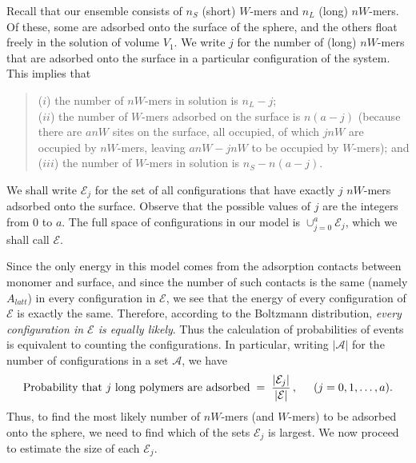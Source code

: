 \documentclass[journal=jacsat,manuscript=article]{achemso}
\begin{document}
Recall that our ensemble consists of $n_S$ (short) $W$-mers and $n_L$ (long) $nW$-mers.
Of these, some are adsorbed onto the surface of the sphere, and the others float freely in the 
solution of volume $V_1$.  We write $j$ for the number of (long) $nW$-mers that are adsorbed 
onto the surface in a particular configuration of the system.  This implies that
\begin{verse}
 ($i$) the number of $nW$-mers in solution is $n_L-j$;
 \\
 ($ii$) the number of $W$-mers adsorbed on the surface is $n(a-j)$ (because there are $anW$ sites on the
 surface, all occupied, of which $jnW$ are occupied by $nW$-mers, leaving $anW-jnW$ to be 
 occupied by $W$-mers); and
 \\
 ($iii$) the number of $W$-mers in solution is $n_S-n(a-j)$.
 \end{verse}  
We shall write $\mathcal{E}_j$ for the set of all configurations that have exactly $j$ $nW$-mers adsorbed 
onto the surface.  Observe that the possible values of $j$ are the integers from 0 to $a$.
The full space of configurations in our model is $\cup_{j=0}^a {\mathcal{E}_j}$, 
which we shall call $\mathcal{E}$.

Since the only energy in this model comes from the adsorption contacts between monomer and surface,
and since the number of such contacts is the same (namely $A_{latt}$) in every configuration
in $\mathcal{E}$, we see that the energy of every configuration of $\mathcal{E}$ is exactly the same.
Therefore, according to the Boltzmann distribution, \textit{every configuration in $\mathcal{E}$ is equally
likely}.  Thus the calculation of probabilities of events is equivalent to counting the configurations.
In particular, writing $|\mathcal{A}|$ for the number of configurations in a set $\mathcal{A}$, we have
\[
    \hbox{Probability that $j$ long polymers are adsorbed}  \;=\; 
    \frac{|\mathcal{E}_j|}{|\mathcal{E}|}\,,   \hspace{5mm}(j=0,1,\ldots,a).
\]
Thus, to find the most likely number of $nW$-mers (and $W$-mers) to be adsorbed onto the sphere,
we need to find which of the sets $\mathcal{E}_j$ is largest.
We now proceed to estimate the size of each $\mathcal{E}_j$.

\smallskip
\end{document}
